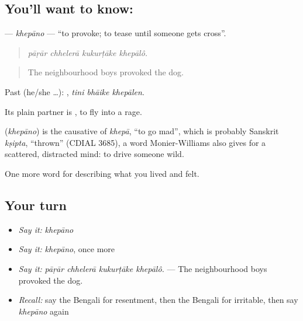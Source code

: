 \subsection*{You'll want to know: }
\textbf{} — \emph{khepāno} — \textquotedblleft{}to provoke; to tease until someone gets cross\textquotedblright{}.

\begin{quote}
   
\end{quote}

\begin{quote}
\emph{pāṛār chhelerā kukurṭāke khepālô.}
\end{quote}

\begin{quote}
The neighbourhood boys provoked the dog.
\end{quote}

Past (he/she …):   , \emph{tini bhāike khepālen}.

Its plain partner is  , to fly into a rage.

\begin{cousinweb}
\textbf{} (\emph{khepāno}) is the causative of \emph{khepā}, \textquotedblleft{}to go mad\textquotedblright{}, which is probably Sanskrit \emph{kṣipta}, \textquotedblleft{}thrown\textquotedblright{} (CDIAL 3685), a word Monier-Williams also gives for a scattered, distracted mind: to drive someone wild.
\end{cousinweb}

\begin{grammarlens}[title={What you've built}]
One more word for describing what you lived and felt.
\end{grammarlens}

\subsection*{Your turn}
\begin{itemize}
\raggedright
  \item \emph{Say it:} \emph{khepāno}
  \item \emph{Say it:} \emph{khepāno}, once more
  \item \emph{Say it:} \emph{pāṛār chhelerā kukurṭāke khepālô.} — The neighbourhood boys provoked the dog.
  \item \emph{Recall:} say the Bengali for resentment, then the Bengali for irritable, then say \emph{khepāno} again
\end{itemize}

